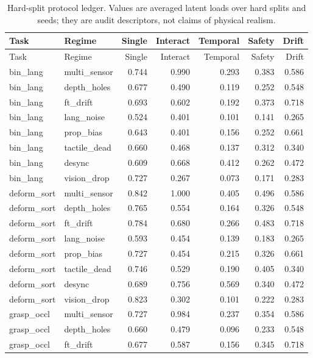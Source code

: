 \documentclass{article}
\begin{document}
\begin{longtable}{@{}llrrrrr@{}}
\caption{Hard-split protocol ledger. Values are averaged latent loads over hard splits and seeds; they are audit descriptors, not claims of physical realism.}\\
\toprule
Task & Regime & Single & Interact & Temporal & Safety & Drift\\
\midrule
\endfirsthead
\toprule
Task & Regime & Single & Interact & Temporal & Safety & Drift\\
\midrule
\endhead
bin\_lang & multi\_sensor & 0.744 & 0.990 & 0.293 & 0.383 & 0.586 \\
bin\_lang & depth\_holes & 0.677 & 0.490 & 0.119 & 0.252 & 0.548 \\
bin\_lang & ft\_drift & 0.693 & 0.602 & 0.192 & 0.373 & 0.718 \\
bin\_lang & lang\_noise & 0.524 & 0.401 & 0.101 & 0.141 & 0.265 \\
bin\_lang & prop\_bias & 0.643 & 0.401 & 0.156 & 0.252 & 0.661 \\
bin\_lang & tactile\_dead & 0.660 & 0.468 & 0.137 & 0.312 & 0.340 \\
bin\_lang & desync & 0.609 & 0.668 & 0.412 & 0.262 & 0.472 \\
bin\_lang & vision\_drop & 0.727 & 0.267 & 0.073 & 0.171 & 0.283 \\
deform\_sort & multi\_sensor & 0.842 & 1.000 & 0.405 & 0.496 & 0.586 \\
deform\_sort & depth\_holes & 0.765 & 0.554 & 0.164 & 0.326 & 0.548 \\
deform\_sort & ft\_drift & 0.784 & 0.680 & 0.266 & 0.483 & 0.718 \\
deform\_sort & lang\_noise & 0.593 & 0.454 & 0.139 & 0.183 & 0.265 \\
deform\_sort & prop\_bias & 0.727 & 0.454 & 0.215 & 0.326 & 0.661 \\
deform\_sort & tactile\_dead & 0.746 & 0.529 & 0.190 & 0.405 & 0.340 \\
deform\_sort & desync & 0.689 & 0.756 & 0.569 & 0.340 & 0.472 \\
deform\_sort & vision\_drop & 0.823 & 0.302 & 0.101 & 0.222 & 0.283 \\
grasp\_occl & multi\_sensor & 0.727 & 0.984 & 0.237 & 0.354 & 0.586 \\
grasp\_occl & depth\_holes & 0.660 & 0.479 & 0.096 & 0.233 & 0.548 \\
grasp\_occl & ft\_drift & 0.677 & 0.587 & 0.156 & 0.345 & 0.718 \\

\end{longtable}
\end{document}
